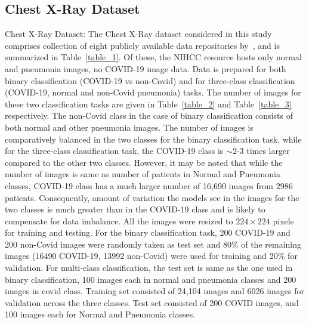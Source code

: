 \documentclass[10pt,journal,compsoc]{IEEEtran}
\begin{document}
\subsection{Chest X-Ray Dataset}
Chest X-Ray Dataset: The Chest X-Ray dataset considered in this study comprises collection of eight publicly available data repositories by~\cite{wang2020covid}, and is summarized in Table~\ref{table_1}. Of these, the NIHCC resource hosts only normal and pneumonia images, no COVID-19 image data. Data is prepared for both binary classification (COVID-19 vs non-Covid) and for three-class classification (COVID-19, normal and non-Covid pneumonia) tasks. The number of images for these two classification tasks are given in Table~\ref{table_2} and Table~\ref{table_3} respectively. The non-Covid class in the case of binary classification consists of both normal and other pneumonia images. The number of images is comparatively balanced in the two classes for the binary classification task, while for the three-class classification task, the COVID-19 class is \begin{math}\sim2\end{math}-3 times larger compared to the other two classes. However, it may be noted that while the number of images is same as number of patients in Normal and Pneumonia classes, COVID-19 class has a much larger number of 16,690 images from 2986 patients. Consequently, amount of variation the models see in the images for the two classes is much greater than in the COVID-19 class and is likely to compensate for data imbalance. All the images were resized to \begin{math}224 \times 224\end{math} pixels for training and testing. For the binary classification task, 200 COVID-19 and 200 non-Covid  images were randomly taken as test set and 80\% of the remaining images (16490 COVID-19, 13992 non-Covid) were used for training and 20\% for validation. For multi-class classification, the test set is same as the one used in binary classification, 100 images each in normal and pneumonia classes and 200 images in covid class. Training set consisted of 24,104 images and 6026 images for validation across the three classes. Test set consisted of 200 COVID images, and 100 images each for Normal and Pneumonia classes. 
\end{document}
